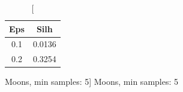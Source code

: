 \documentclass{classrep}
\begin{document}
{{{\begin{table}[!htbp]
\begin{minipage}{.24\textwidth}
                        \label{db_scan_table_Moons_manh_min_sample4}
                    \end{minipage}
                    \hfill
                    \begin{minipage}{.24\textwidth}
                        \centering
                        \begin{tabular}{|c|c|}
                            \hline
                            Eps & Silh \\ \hline
                            0.1 & 0.0136 \\ \hline
                            0.2 & 0.3254 \\ \hline
                        \end{tabular}
                        \caption
                        [Moons, min samples: 5]
                        {Moons, min samples: 5}
                        \label{db_scan_table_Moons_manh_min_sample5}
                    \end{minipage}
                \end{table}
                \FloatBarrier


}}}
\end{document}
